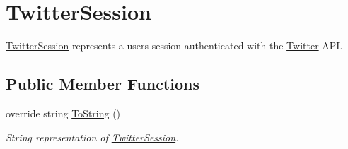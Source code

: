 \hypertarget{class_voxel_busters_1_1_native_plugins_1_1_twitter_session}{}\section{Twitter\+Session}
\label{class_voxel_busters_1_1_native_plugins_1_1_twitter_session}


\hyperlink{class_voxel_busters_1_1_native_plugins_1_1_twitter_session}{Twitter\+Session} represents a user\textquotesingle{}s session authenticated with the \hyperlink{class_voxel_busters_1_1_native_plugins_1_1_twitter}{Twitter} A\+P\+I.  


\subsection*{Public Member Functions}
\begin{DoxyCompactItemize}
\item 
override string \hyperlink{class_voxel_busters_1_1_native_plugins_1_1_twitter_session_aa73e7c4dd1df5fd5fbf81c7764ee1533}{To\+String} ()
\begin{DoxyCompactList}\small\item\em String representation of \hyperlink{class_voxel_busters_1_1_native_plugins_1_1_twitter_session}{Twitter\+Session}. \end{DoxyCompactList}\end{DoxyCompactItemize}
